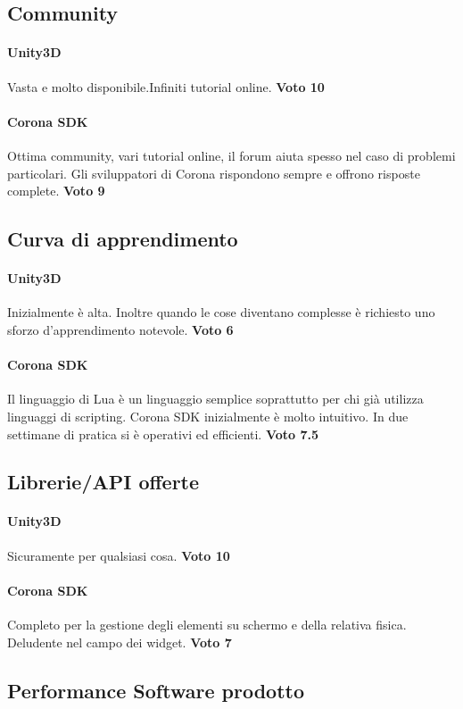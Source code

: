 	\subsection*{Community}
		\paragraph{Unity3D} Vasta e molto disponibile.Infiniti tutorial online. \textbf{Voto 10}
		\paragraph{Corona SDK} Ottima community, vari tutorial online, il forum aiuta spesso nel caso di problemi particolari. Gli sviluppatori di Corona rispondono sempre e offrono risposte complete. \textbf{Voto 9}
	
	\subsection*{Curva di apprendimento}
		\paragraph{Unity3D} Inizialmente è alta. Inoltre quando le cose diventano complesse è richiesto uno sforzo d'apprendimento notevole. \textbf{Voto 6}
		\paragraph{Corona SDK} Il linguaggio di Lua è un linguaggio semplice soprattutto per chi già utilizza linguaggi di scripting. Corona SDK inizialmente è molto intuitivo. In due settimane di pratica si è operativi ed efficienti. \textbf{Voto 7.5}
	
	\subsection*{Librerie/API offerte}
		\paragraph{Unity3D} Sicuramente per qualsiasi cosa. \textbf{Voto 10}
		\paragraph{Corona SDK} Completo per la gestione degli elementi su schermo e della relativa fisica. Deludente nel campo dei widget. \textbf{Voto 7}
		
	\subsection*{Performance Software prodotto}
